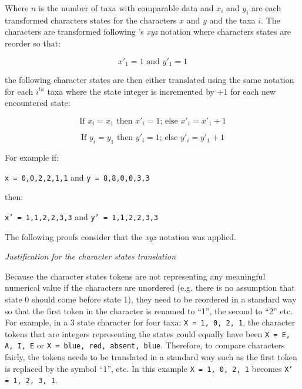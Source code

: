 \documentclass[12pt,letterpaper]{article}
\renewcommand{\subsection}[1]{%
\bigskip
\begin{center}
\begin{large}
\normalfont\itshape #1
\end{large}
\end{center}}
\begin{document}
\noindent Where $n$ is the number of taxa with comparable data and $x_i$ and $y_i$ are each transformed characters states for the characters $x$ and $y$ and the taxa $i$.
The characters are transformed following \cite{felsenstein2004inferring}'s \textit{xyz} notation where characters states are reorder so that:

\begin{equation}
x'_1 = 1 \text{ and } y'_1 = 1
\end{equation}

\noindent the following character states are then either translated using the same notation for each $i^{th}$ taxa where the state integer is incremented by $+1$ for each new encountered state:

\begin{equation}
\text{If } x_i = x_1 \text{ then } x'_i = 1 \text{; else } x'_i = x'_1 + 1
\end{equation}

\begin{equation}
\text{If } y_i = y_1 \text{ then } y'_i = 1 \text{; else } y'_i = y'_1 + 1
\end{equation}

\noindent For example if:

\texttt{x = {0,0,2,2,1,1}} and \texttt{y = {8,8,0,0,3,3}}

\noindent then:

\texttt{x' = {1,1,2,2,3,3}} and \texttt{y' = {1,1,2,2,3,3}}


\noindent The following proofs consider that the \textit{xyz} notation was applied.

\subsection{Justification for the character states translation}
Because the character states tokens are not representing any meaningful numerical value if the characters are unordered (e.g. there is no assumption that state 0 should come before state 1), they need to be reordered in a standard way so that the first token in the character is renamed to ``1'', the second to ``2'' etc.
For example, in a 3 state character for four taxa: \texttt{X = {1, 0, 2, 1}}, the character tokens that are integers representing the states could equally have been \texttt{X = {E, A, I, E}} or \texttt{X = {blue, red, absent, blue}}.
Therefore, to compare characters fairly, the tokens needs to be translated in a standard way such as the first token is replaced by the symbol ``1'', etc.
In this example \texttt{X = {1, 0, 2, 1}} becomes \texttt{X' = {1, 2, 3, 1}}.
\end{document}
